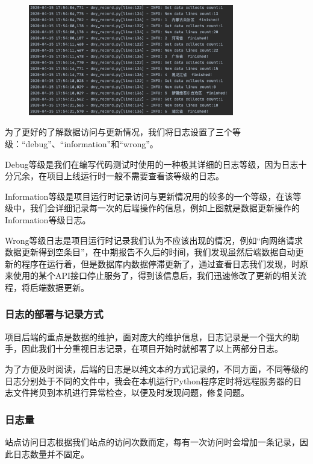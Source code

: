\documentclass{article}
\begin{document}
\begin{figure}[H]
\centering
\includegraphics[width=0.8\textwidth]{pic6.png}
\end{figure}

为了更好的了解数据访问与更新情况，我们将日志设置了三个等级：“debug”、“information”和“wrong”。

Debug等级是我们在编写代码测试时使用的一种极其详细的日志等级，因为日志十分冗余，在项目上线运行时一般不需要查看该等级的日志。

Information等级是项目运行时记录访问与更新情况用的较多的一个等级，在该等级中，我们会详细记录每一次的后端操作的信息，例如上图就是数据更新操作的Information等级日志。

Wrong等级日志是项目运行时记录我们认为不应该出现的情况，例如“向网络请求数据更新得到空条目”，在中期报告不久后的时间，我们发现虽然后端数据自动更新的程序在运行着，但是数据库内数据停滞更新了，通过查看日志我们发现，时原来使用的某个API接口停止服务了，得到该信息后，我们迅速修改了更新的相关流程，将后端数据更新。


\subsubsection{日志的部署与记录方式}
项目后端的重点是数据的维护，面对庞大的维护信息，日志记录是一个强大的助手，因此我们十分重视日志记录，在项目开始时就部署了以上两部分日志。

为了方便及时阅读，后端的日志是以纯文本的方式记录的，不同方面，不同等级的日志分别处于不同的文件中，我会在本机运行Python程序定时将远程服务器的日志文件拷贝到本机进行异常检查，以便及时发现问题，修复问题。


\subsubsection{日志量}

站点访问日志根据我们站点的访问次数而定，每有一次访问时会增加一条记录，因此日志数量并不固定。
\end{document}
